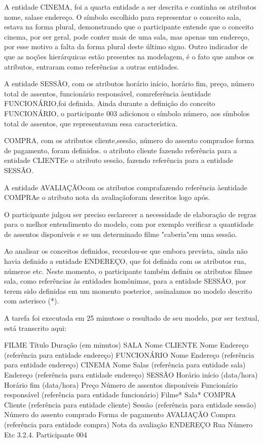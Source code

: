 A entidade CINEMA, foi a quarta entidade a ser descrita e continha os atributos nome, salase endereço. O símbolo escolhido para representar o conceito sala, estava na forma plural, demonstrando que o participante entende que o conceito cinema, por ser geral, pode conter mais de uma sala, mas apenas um endereço, por esse motivo a falta da forma plural deste último signo. Outro indicador de que as noções hierárquicas estão presentes na modelagem, é o fato que ambos os atributos, entraram como referências a outras entidades.

A entidade SESSÃO, com os atributos horário início, horário fim, preço, número total de assentos, funcionário responsável, comreferência àentidade FUNCIONÁRIO,foi definida. Ainda durante a definição do conceito FUNCIONÁRIO, o participante 003 adicionou o símbolo número, aos símbolos total de assentos, que representavam essa característica.

COMPRA, com os atributos cliente,sessão, número do assento compradoe forma de pagamento, foram definidos. o atributo cliente fazendo referência para a entidade CLIENTEe o atributo sessão, fazendo referência para a entidade SESSÃO.

A entidade AVALIAÇÃOcom os atributos comprafazendo referência àentidade COMPRAe o atributo nota da avaliaçãoforam descritos logo após.

O participante julgou ser preciso esclarecer a necessidade de elaboração de regras para o melhor entendimento do modelo, com por exemplo verificar a quantidade de assentos disponíveis e se um determinado filme "caberia"em uma sessão.

Ao analisar os conceitos definidos, recordou-se que embora prevista, ainda não havia definido a entidade ENDEREÇO, que foi definida com os atributos rua, númeroe etc. Neste momento, o participante também definiu os atributos filmee sala, como referências às entidades homônimas, para a entidade SESSÃO, por terem sido definidas em um momento posterior, assinalamos no modelo descrito com asterisco (*).

A tarefa foi executada em 25 minutose o resultado de seu modelo, por ser textual, está transcrito aqui:

FILME
 Título
 Duração (em minutos)
SALA
 Nome
CLIENTE
 Nome
 Endereço (referência para entidade endereço)
FUNCIONÁRIO
 Nome
 Endereço (referência para entidade endereço)
CINEMA
 Nome
  Salas (referência para entidade sala)
  Endereço (referência para entidade endereço)
SESSÃO
 Horário início (data/hora)
 Horário fim (data/hora)
 Preço
 Número de assentos disponíveis
 Funcionário responsável (referência para entidade funcionário)
 Filme*
 Sala*
COMPRA
 Cliente (referência para entidade cliente)
 Sessão (referência para entidade sessão)
 Número do assento comprado
 Forma de pagamento
AVALIAÇÃO
 Compra (referência para entidade compra)
 Nota da avaliação
ENDEREÇO
 Rua
 Número
 Etc
3.2.4. Participante 004

